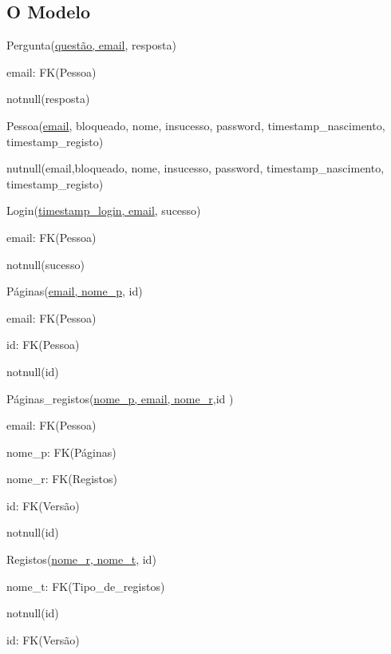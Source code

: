 \documentclass[11pt,a4paper]{article}
\begin{document}
\subsection{O Modelo}

\begin{description}[noitemsep]
	\item Pergunta(\underline{quest\~ao, email}, resposta)
	\item email: FK(Pessoa)
	\item notnull(resposta)
\end{description}

\begin{description}[noitemsep]
	\item Pessoa(\underline{email}, bloqueado, nome, insucesso, password, timestamp\_nascimento, timestamp\_registo)
	\item nutnull(email,bloqueado, nome, insucesso, password, timestamp\_nascimento, timestamp\_registo)
\end{description}

\begin{description}[noitemsep]
	\item Login(\underline{timestamp\_login, email}, sucesso)
	\item email: FK(Pessoa)
	\item notnull(sucesso)
\end{description}

\begin{description}[noitemsep]
	\item P\'{a}ginas(\underline{email, nome\_p}, id)
	\item email: FK(Pessoa)
	\item id: FK(Pessoa)
	\item notnull(id)
\end{description}

\begin{description}[noitemsep]
	\item P\'{a}ginas\_registos(\underline{nome\_p, email, nome\_r},id )
	\item email: FK(Pessoa)
	\item nome\_p: FK(P\'{a}ginas)
	\item nome\_r: FK(Registos)
	\item id: FK(Vers\~{a}o)
	\item notnull(id)
\end{description}

\begin{description}[noitemsep]
	\item Registos(\underline{nome\_r, nome\_t},  id)
	\item nome\_t: FK(Tipo\_de\_registos)
	\item notnull(id)
	\item id: FK(Vers\~{a}o)
\end{description}
\end{document}
